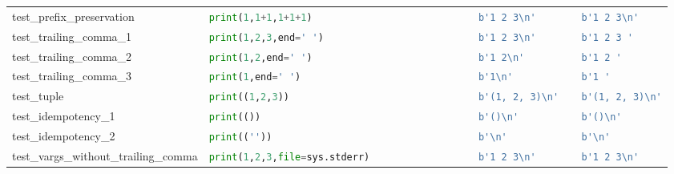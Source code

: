 \begin{table}[ht]
\begin{tabular}{@{}l|lll@{}}
    test\_prefix\_preservation            & \lstinline[language=Python, style=pythonstyle]|print(1,1+1,1+1+1)                           | & \lstinline[language=Python, style=pythonstyle]|b'1 2 3\n' |             & \lstinline[language=Python, style=pythonstyle]|b'1 2 3\n'    | \\
    test\_trailing\_comma\_1              & \lstinline[language=Python, style=pythonstyle]|print(1,2,3,end=' ')                         | & \lstinline[language=Python, style=pythonstyle]|b'1 2 3\n'  |            & \lstinline[language=Python, style=pythonstyle]|b'1 2 3 '     |                \\
    test\_trailing\_comma\_2              & \lstinline[language=Python, style=pythonstyle]|print(1,2,end=' ')                           | & \lstinline[language=Python, style=pythonstyle]|b'1 2\n'   |             & \lstinline[language=Python, style=pythonstyle]|b'1 2 '       |                \\
    test\_trailing\_comma\_3              & \lstinline[language=Python, style=pythonstyle]|print(1,end=' ')                             | & \lstinline[language=Python, style=pythonstyle]|b'1\n'  |                & \lstinline[language=Python, style=pythonstyle]|b'1 '         |                \\
    test\_tuple                           & \lstinline[language=Python, style=pythonstyle]|print((1,2,3))                               | & \lstinline[language=Python, style=pythonstyle]|b'(1, 2, 3)\n'  |        & \lstinline[language=Python, style=pythonstyle]|b'(1, 2, 3)\n'| \\
    test\_idempotency\_1                  & \lstinline[language=Python, style=pythonstyle]|print(())                                    | & \lstinline[language=Python, style=pythonstyle]|b'()\n'   |              & \lstinline[language=Python, style=pythonstyle]|b'()\n'       | \\
    test\_idempotency\_2                  & \lstinline[language=Python, style=pythonstyle]|print((''))                                  | & \lstinline[language=Python, style=pythonstyle]|b'\n' |                  & \lstinline[language=Python, style=pythonstyle]|b'\n'         | \\
    test\_vargs\_without\_trailing\_comma & \lstinline[language=Python, style=pythonstyle]|print(1,2,3,file=sys.stderr)                 | & \lstinline[language=Python, style=pythonstyle]|b'1 2 3\n'    |          & \lstinline[language=Python, style=pythonstyle]|b'1 2 3\n'    | \\

\end{tabular}
\end{table}
